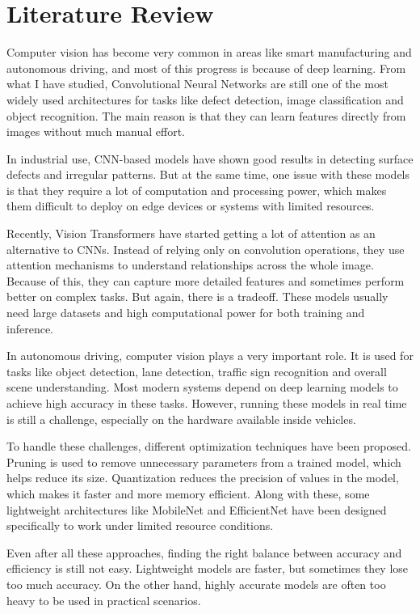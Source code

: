 \documentclass[conference]{IEEEtran}
\begin{document}
\section{Literature Review}

Computer vision has become very common in areas like smart manufacturing and autonomous driving, and most of this progress is because of deep learning. From what I have studied, Convolutional Neural Networks are still one of the most widely used architectures for tasks like defect detection, image classification and object recognition. The main reason is that they can learn features directly from images without much manual effort.

In industrial use, CNN-based models have shown good results in detecting surface defects and irregular patterns. But at the same time, one issue with these models is that they require a lot of computation and processing power, which makes them difficult to deploy on edge devices or systems with limited resources.

Recently, Vision Transformers have started getting a lot of attention as an alternative to CNNs. Instead of relying only on convolution operations, they use attention mechanisms to understand relationships across the whole image. Because of this, they can capture more detailed features and sometimes perform better on complex tasks. But again, there is a tradeoff. These models usually need large datasets and high computational power for both training and inference.

In autonomous driving, computer vision plays a very important role. It is used for tasks like object detection, lane detection, traffic sign recognition and overall scene understanding. Most modern systems depend on deep learning models to achieve high accuracy in these tasks. However, running these models in real time is still a challenge, especially on the hardware available inside vehicles.

To handle these challenges, different optimization techniques have been proposed. Pruning is used to remove unnecessary parameters from a trained model, which helps reduce its size. Quantization reduces the precision of values in the model, which makes it faster and more memory efficient. Along with these, some lightweight architectures like MobileNet and EfficientNet have been designed specifically to work under limited resource conditions.

Even after all these approaches, finding the right balance between accuracy and efficiency is still not easy. Lightweight models are faster, but sometimes they lose too much accuracy. On the other hand, highly accurate models are often too heavy to be used in practical scenarios.
\end{document}
